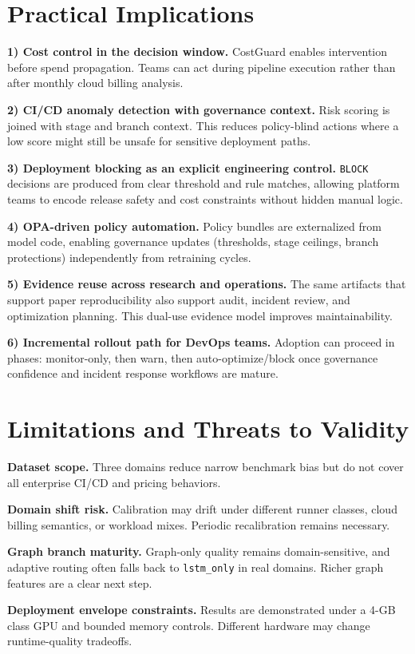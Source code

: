 \documentclass[10pt,twocolumn]{article}
\begin{document}
\FloatBarrier
\section{Practical Implications}
\textbf{1) Cost control in the decision window.}
CostGuard enables intervention before spend propagation. Teams can act during pipeline execution rather than after monthly cloud billing analysis.

\textbf{2) CI/CD anomaly detection with governance context.}
Risk scoring is joined with stage and branch context. This reduces policy-blind actions where a low score might still be unsafe for sensitive deployment paths.

\textbf{3) Deployment blocking as an explicit engineering control.}
\texttt{BLOCK} decisions are produced from clear threshold and rule matches, allowing platform teams to encode release safety and cost constraints without hidden manual logic.

\textbf{4) OPA-driven policy automation.}
Policy bundles are externalized from model code, enabling governance updates (thresholds, stage ceilings, branch protections) independently from retraining cycles.

\textbf{5) Evidence reuse across research and operations.}
The same artifacts that support paper reproducibility also support audit, incident review, and optimization planning. This dual-use evidence model improves maintainability.

\textbf{6) Incremental rollout path for DevOps teams.}
Adoption can proceed in phases: monitor-only, then warn, then auto-optimize/block once governance confidence and incident response workflows are mature.

\FloatBarrier
\section{Limitations and Threats to Validity}
\textbf{Dataset scope.}
Three domains reduce narrow benchmark bias but do not cover all enterprise CI/CD and pricing behaviors.

\textbf{Domain shift risk.}
Calibration may drift under different runner classes, cloud billing semantics, or workload mixes. Periodic recalibration remains necessary.

\textbf{Graph branch maturity.}
Graph-only quality remains domain-sensitive, and adaptive routing often falls back to \texttt{lstm\_only} in real domains. Richer graph features are a clear next step.

\textbf{Deployment envelope constraints.}
Results are demonstrated under a 4-GB class GPU and bounded memory controls. Different hardware may change runtime-quality tradeoffs.
\end{document}
